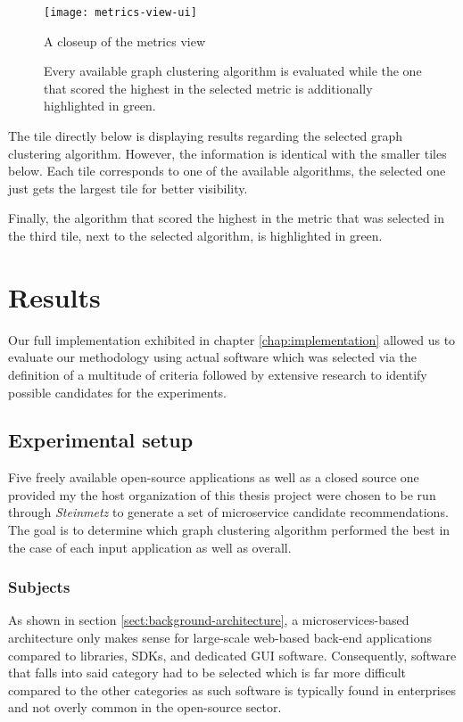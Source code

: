 \documentclass[12pt,a4paper]{report}
\begin{document}
\begin{figure}[htbp]
\centering
\texttt{[image: metrics-view-ui]}
\caption{A closeup of the metrics view}
\caption*{
  Every available graph clustering algorithm is evaluated while the one that
  scored the highest in the selected metric is additionally highlighted in green.
}
\label{fig:metrics-view-ui}
\end{figure}

The tile directly below is displaying results regarding the selected
graph clustering algorithm. However, the information is identical with the
smaller tiles below. Each tile corresponds to one of the available algorithms,
the selected one just gets the largest tile for better visibility.

Finally, the algorithm that scored the highest in the metric that was selected
in the third tile, next to the selected algorithm, is highlighted in green.




\chapter{Results} \label{chap:results}

Our full implementation exhibited in chapter \ref{chap:implementation} allowed us
to evaluate our methodology using actual software which was selected via the
definition of a multitude of criteria followed by extensive research to identify
possible candidates for the experiments.



\section{Experimental setup}

Five freely available open-source applications as well as a closed source one
provided my the host organization of this thesis project were chosen to be run through
\textit{Steinmetz} to generate a set of microservice candidate recommendations.
The goal is to determine which graph clustering algorithm performed the best in the case
of each input application as well as overall.


\subsection{Subjects}

As shown in section \ref{sect:background-architecture}, a microservices\hyp based
architecture only makes sense for large\hyp scale web\hyp based back\hyp end
applications compared to libraries, SDKs, and dedicated GUI software.
Consequently, software that falls into said category had to be selected which
is far more difficult compared to the other categories as such software is
typically found in enterprises and not overly common in the open-source sector.
\end{document}
